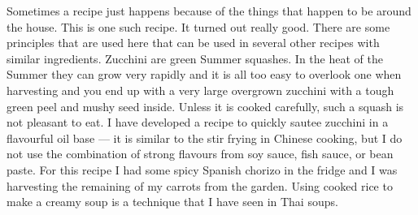 \documentclass[11pt,letterpaper]{article}
\begin{document}


Sometimes a recipe just happens because of the things that happen to be around the house. This is one such recipe. It turned out really good. There are some principles that are used here that can be used in several other recipes with similar ingredients. Zucchini are green Summer squashes. In the heat of the Summer they can grow very rapidly and it is all too easy to overlook one when harvesting and you end up with a very large overgrown zucchini with a tough green peel and mushy seed inside. Unless it is cooked carefully, such a squash is not pleasant to eat. I have developed a recipe to quickly sautee zucchini in a flavourful oil base --- it is similar to the stir frying in Chinese cooking, but I do not use the combination of strong flavours from soy sauce, fish sauce, or bean paste. For this recipe I had some spicy Spanish chorizo in the fridge and  I was harvesting the remaining of my carrots from the garden. Using cooked rice to make a creamy soup is a technique that I have seen in Thai soups.
\end{document}
